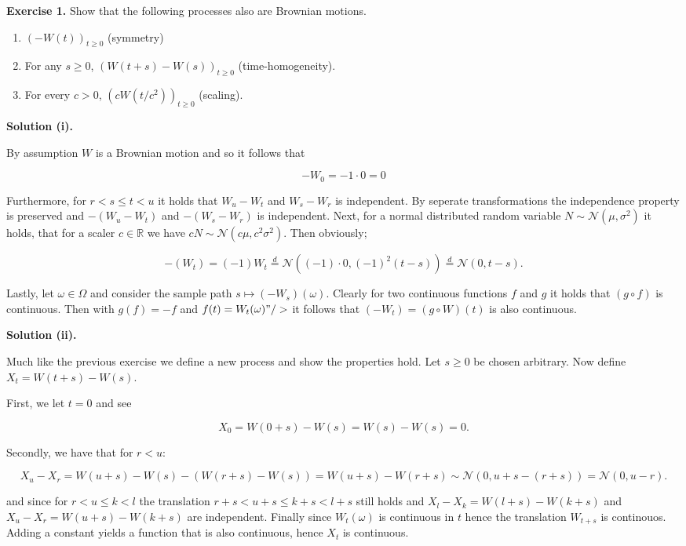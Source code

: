 \documentclass[
]{book}
\providecommand{\tightlist}{%
  \setlength{\itemsep}{0pt}\setlength{\parskip}{0pt}}
\begin{document}
\textbf{Exercise 1.} Show that the following processes also are Brownian motions.

\begin{enumerate}
\def\labelenumi{\roman{enumi}.}
\tightlist
\item
  \((-W(t))_{t\ge 0}\) (symmetry)
\item
  For any \(s\ge 0\), \((W(t+s)-W(s))_{t\ge 0}\) (time-homogeneity).
\item
  For every \(c>0\), \((cW(t/c^2))_{t\ge 0}\) (scaling).
\end{enumerate}

\textbf{Solution (i).}

By assumption \(W\) is a Brownian motion and so it follows that

\[-W_0=-1\cdot0=0\]

Furthermore, for \(r<s\le t< u\) it holds that \(W_u-W_t\) and \(W_s-W_r\) is independent. By seperate transformations the independence property is preserved and \(-(W_u-W_t)\) and \(-(W_s-W_r)\) is independent. Next, for a normal distributed random variable \(N\sim\mathcal{N}(\mu,\sigma^2)\) it holds, that for a scaler \(c\in\mathbb{R}\) we have \(c N\sim\mathcal{N}(c\mu,c^2\sigma ^2)\). Then obviously;

\[-(W_t)=(-1)W_t\stackrel{d}{=}\mathcal{N}((-1)\cdot0,(-1)^2(t-s))\stackrel{d}{=}\mathcal{N}( 0,t-s).\]

Lastly, let \(\omega \in \Omega\) and consider the sample path \(s\mapsto (-W_s)(\omega)\). Clearly for two continuous functions \(f\) and \(g\) it holds that \((g\circ f)\) is continuous. Then with \(g(f)=-f\) and \(f(t)=W_t(\omega)"/>\) it follows that \((-W_t)=(g\circ W)(t)\) is also continuous.

\textbf{Solution (ii).}

Much like the previous exercise we define a new process and show the properties hold. Let \(s\ge 0\) be chosen arbitrary. Now define \(X_t=W(t+s)-W(s)\).

First, we let \(t=0\) and see

\[X_0=W(0+s)-W(s)=W(s)-W(s)=0.\]

Secondly, we have that for \(r<u\):

\[X_u-X_r=W(u+s)-W(s)-(W(r+s)-W(s))=W(u+s)-W(r+s)\sim \mathcal{N}(0,u+s-(r+s))=\mathcal{N}(0,u-r).\]

and since for \(r<u\le k<l\) the translation \(r+s<u+s\le k+s<l+s\) still holds and \(X_l-X_k=W(l+s)-W(k+s)\) and \(X_u-X_r=W(u+s)-W(k+s)\) are independent. Finally since \(W_t(\omega)\) is continuous in \(t\) hence the translation \(W_{t+s}\) is continouos. Adding a constant yields a function that is also continuous, hence \(X_t\) is continuous.
\end{document}
